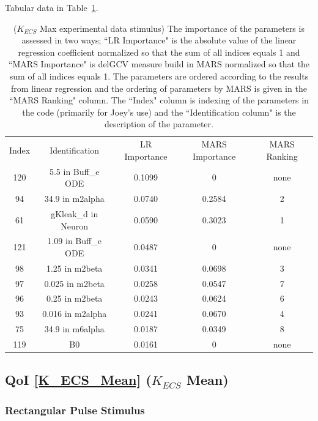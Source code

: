 \documentclass[12pt]{article}
\numberwithin{equation}{section}
\begin{document}
Tabular data in Table~\ref{qoi_K_ECS_Max_ex}.

\begin{table}[h]
\centering
\begin{tabular}{ccccc}
Index & Identification & LR Importance & MARS Importance & MARS Ranking \\
120 & 5.5 in Buff\_e ODE & 0.1099 & 0 & none\\
94 & 34.9 in m2alpha & 0.0740 & 0.2584 & 2\\
61 & gKleak\_d in Neuron & 0.0590 &  0.3023 & 1\\ 
121 & 1.09 in Buff\_e ODE & 0.0487 & 0 &  none\\
98 & 1.25 in m2beta & 0.0341 &  0.0698 & 3\\
97 & 0.025 in m2beta & 0.0258 & 0.0547 & 7\\
96 & 0.25 in m2beta & 0.0243 &  0.0624 & 6\\
93 & 0.016 in m2alpha & 0.0241 & 0.0670 & 4\\
75 & 34.9 in m6alpha & 0.0187 & 0.0349 & 8\\
119 & B0 & 0.0161 & 0 & none
\end{tabular}
\caption{ ($K_{ECS}$ Max experimental data stimulus) The importance of the parameters is assessed in two ways; ``LR Importance" is the absolute value of the linear regression coefficient normalized so that the sum of all indices equals 1 and ``MARS Importance" is delGCV measure build in MARS normalized so that the sum of all indices equals 1. The parameters are ordered according to the results from linear regression and the ordering of parameters by MARS is given in the ``MARS Ranking" column. The ``Index" column is indexing of the parameters in the code (primarily for Joey's use) and the ``Identification column" is the description of the parameter.}
\label{qoi_K_ECS_Max_ex}
\end{table}


\newpage
\subsection{QoI \eqref{K_ECS_Mean} ($K_{ECS}$ Mean)}

\subsubsection{Rectangular Pulse Stimulus}
\end{document}
